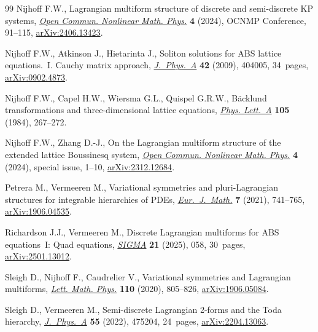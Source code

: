 \documentclass[pdftex]{sigma}
\numberwithin{equation}{section}
\begin{document}
\begin{thebibliography}{99}
Nijhoff F.W., Lagrangian multiform structure of discrete and semi-discrete {KP}
 systems, \href{https://doi.org/10.46298/ocnmp.13809}{\textit{Open Commun.
 Nonlinear Math. Phys.}} \textbf{4} (2024), OCNMP Conference, 91--115,
 \href{http://arxiv.org/abs/2406.13423}{arXiv:2406.13423}.

Nijhoff F.W., Atkinson J., Hietarinta J., Soliton solutions for {ABS} lattice
 equations.~{I}. {C}auchy matrix approach,
 \href{https://doi.org/10.1088/1751-8113/42/40/404005}{\textit{J.~Phys.~A}}
 \textbf{42} (2009), 404005, 34~pages,
 \href{http://arxiv.org/abs/0902.4873}{arXiv:0902.4873}.

Nijhoff F.W., Capel H.W., Wiersma G.L., Quispel G.R.W., B\"acklund
 transformations and three-dimensional lattice equations,
 \href{https://doi.org/10.1016/0375-9601(84)90994-0}{\textit{Phys. Lett.~A}}
 \textbf{105} (1984), 267--272.

Nijhoff F.W., Zhang D.-J., On the {L}agrangian multiform structure of the
 extended lattice {B}oussinesq system,
 \href{https://doi.org/10.46298/ocnmp.12759}{\textit{Open Commun. Nonlinear
 Math. Phys.}} \textbf{4} (2024), special issue, 1--10,
 \href{http://arxiv.org/abs/2312.12684}{arXiv:2312.12684}.

Petrera M., Vermeeren M., Variational symmetries and pluri-{L}agrangian
 structures for integrable hierarchies of {PDE}s,
 \href{https://doi.org/10.1007/s40879-020-00436-7}{\textit{Eur.~J.~Math.}}
 \textbf{7} (2021), 741--765,
 \href{http://arxiv.org/abs/1906.04535}{arXiv:1906.04535}.

Richardson J.J., Vermeeren M., Discrete {L}agrangian multiforms for {ABS}
 equations~{I}: Quad equations,
 \href{https://doi.org/10.3842/SIGMA.2025.058}{\textit{SIGMA}} \textbf{21}
 (2025), 058, 30~pages,
 \href{http://arxiv.org/abs/2501.13012}{arXiv:2501.13012}.

Sleigh D., Nijhoff F., Caudrelier V., Variational symmetries and {L}agrangian
 multiforms, \href{https://doi.org/10.1007/s11005-019-01240-5}{\textit{Lett.
 Math. Phys.}} \textbf{110} (2020), 805--826,
 \href{http://arxiv.org/abs/1906.05084}{arXiv:1906.05084}.

Sleigh D., Vermeeren M., Semi-discrete {L}agrangian 2-forms and the {T}oda
 hierarchy,
 \href{https://doi.org/10.1088/1751-8121/aca451}{\textit{J.~Phys.~A}}
 \textbf{55} (2022), 475204, 24~pages,
 \href{http://arxiv.org/abs/2204.13063}{arXiv:2204.13063}.


\end{thebibliography}
\end{document}
